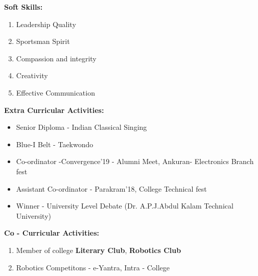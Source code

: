 \documentclass {article}
\begin{document}
\begin {flushleft} \Large \textbf{ Soft Skills:} \end{flushleft}
	\begin {enumerate}
		\item Leadership Quality
		\item Sportsman Spirit
		\item Compassion and integrity
		\item Creativity
		\item Effective Communication
	\end {enumerate}
\begin {flushleft} \Large \textbf{ Extra Curricular Activities:} \end{flushleft}
	\begin {itemize}
		\item Senior Diploma - Indian Classical Singing
		\item Blue-I Belt - Taekwondo
		\item Co-ordinator -Convergence'19 - Alumni Meet, Ankuran- Electronics Branch fest
		\item Assistant Co-ordinator - Parakram'18, College Technical fest 
		\item Winner - University Level Debate (Dr. A.P.J.Abdul Kalam Technical University)
	\end {itemize}
\begin {flushleft} \Large \textbf {Co - Curricular Activities:} \end{flushleft}
	\begin {enumerate}
		\item Member of college \textbf{Literary Club}, \textbf{Robotics Club}
		\item Robotics Competitons - e-Yantra, Intra - College		 
	\end {enumerate}
\end{document}
